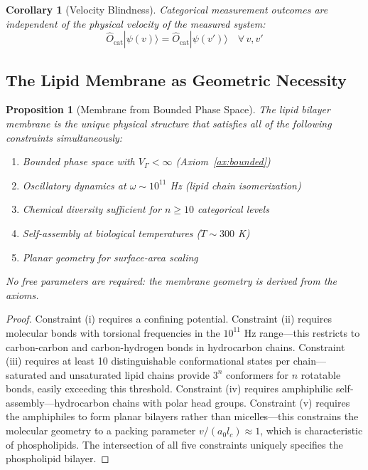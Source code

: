 \documentclass[12pt]{article}
\newtheorem{proposition}[theorem]{Proposition}
\newtheorem{corollary}[theorem]{Corollary}
\theoremstyle{definition}
\theoremstyle{remark}
\newcommand{\Ocat}{\hat{O}_{\mathrm{cat}}}
\newcommand{\Vgamma}{V_\Gamma}
\begin{document}
\begin{corollary}[Velocity Blindness]
\label{cor:velocity}
Categorical measurement outcomes are independent of the physical velocity of the measured system:
\begin{equation}
\label{eq:velocity_blindness}
\Ocat |\psi(v)\rangle = \Ocat |\psi(v')\rangle \quad \forall \, v, v'
\end{equation}
\end{corollary}

\subsection{The Lipid Membrane as Geometric Necessity}

\begin{proposition}[Membrane from Bounded Phase Space]
\label{prop:membrane}
The lipid bilayer membrane is the unique physical structure that satisfies all of the following constraints simultaneously:
\begin{enumerate}[label=(\roman*)]
    \item Bounded phase space with $\Vgamma < \infty$ (Axiom~\ref{ax:bounded})
    \item Oscillatory dynamics at $\omega \sim 10^{11}$ Hz (lipid chain isomerization)
    \item Chemical diversity sufficient for $n \geq 10$ categorical levels
    \item Self-assembly at biological temperatures ($T \sim 300$ K)
    \item Planar geometry for surface-area scaling
\end{enumerate}
No free parameters are required: the membrane geometry is derived from the axioms.
\end{proposition}

\begin{proof}
Constraint (i) requires a confining potential. Constraint (ii) requires molecular bonds with torsional frequencies in the $10^{11}$ Hz range---this restricts to carbon-carbon and carbon-hydrogen bonds in hydrocarbon chains. Constraint (iii) requires at least 10 distinguishable conformational states per chain---saturated and unsaturated lipid chains provide $3^n$ conformers for $n$ rotatable bonds, easily exceeding this threshold. Constraint (iv) requires amphiphilic self-assembly---hydrocarbon chains with polar head groups. Constraint (v) requires the amphiphiles to form planar bilayers rather than micelles---this constrains the molecular geometry to a packing parameter $v/(a_0 l_c) \approx 1$, which is characteristic of phospholipids. The intersection of all five constraints uniquely specifies the phospholipid bilayer. \qedhere
\end{proof}
\end{document}

